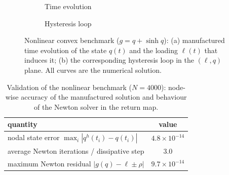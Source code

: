 \begin{figure}[t]
  \centering
  \begin{subfigure}[t]{0.47\textwidth}
    \centering
    \caption{Time evolution}
  \end{subfigure}
  \hfill
  \begin{subfigure}[t]{0.47\textwidth}
    \centering
    \caption{Hysteresis loop}
  \end{subfigure}
  \caption{Nonlinear convex benchmark ($g=q+\sinh q$): (a) manufactured
  time evolution of the state $q(t)$ and the loading $\ell(t)$ that
  induces it; (b) the corresponding hysteresis loop in the $(\ell,q)$
  plane. All curves are the numerical solution.}
  \label{fig:time3}
\end{figure}

\begin{table}[t]
  \centering
  \caption{Validation of the nonlinear benchmark ($N=4000$): node-wise
  accuracy of the manufactured solution and behaviour of the Newton
  solver in the return map.}
  \label{tab:val3}
  \begin{tabular}{lc}
    \toprule
    quantity & value \\
    \midrule
    nodal state error $\max_i|q^h(t_i)-q(t_i)|$ & $4.8\times10^{-14}$ \\
    average Newton iterations / dissipative step & $3.0$ \\
    maximum Newton residual $|g(q)-\ell\pm\rho|$ & $9.7\times10^{-14}$ \\
    \bottomrule
  \end{tabular}
\end{table}

